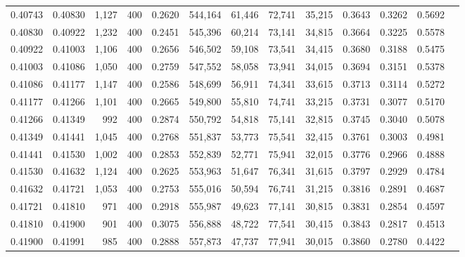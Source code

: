 \begin{tabular}{rrrrrrrrrrrrr}
0.40743 & 0.40830 &  1,127 & 400 &                                     0.2620 & 544,164 &  61,446 &  72,741 &  35,215 & 0.3643 & 0.3262 & 0.5692 \\
0.40830 & 0.40922 &  1,232 & 400 &                                     0.2451 & 545,396 &  60,214 &  73,141 &  34,815 & 0.3664 & 0.3225 & 0.5578 \\
0.40922 & 0.41003 &  1,106 & 400 &                                     0.2656 & 546,502 &  59,108 &  73,541 &  34,415 & 0.3680 & 0.3188 & 0.5475 \\
0.41003 & 0.41086 &  1,050 & 400 &                                     0.2759 & 547,552 &  58,058 &  73,941 &  34,015 & 0.3694 & 0.3151 & 0.5378 \\
0.41086 & 0.41177 &  1,147 & 400 &                                     0.2586 & 548,699 &  56,911 &  74,341 &  33,615 & 0.3713 & 0.3114 & 0.5272 \\
0.41177 & 0.41266 &  1,101 & 400 &                                     0.2665 & 549,800 &  55,810 &  74,741 &  33,215 & 0.3731 & 0.3077 & 0.5170 \\
0.41266 & 0.41349 &    992 & 400 &                                     0.2874 & 550,792 &  54,818 &  75,141 &  32,815 & 0.3745 & 0.3040 & 0.5078 \\
0.41349 & 0.41441 &  1,045 & 400 &                                     0.2768 & 551,837 &  53,773 &  75,541 &  32,415 & 0.3761 & 0.3003 & 0.4981 \\
0.41441 & 0.41530 &  1,002 & 400 &                                     0.2853 & 552,839 &  52,771 &  75,941 &  32,015 & 0.3776 & 0.2966 & 0.4888 \\
0.41530 & 0.41632 &  1,124 & 400 &                                     0.2625 & 553,963 &  51,647 &  76,341 &  31,615 & 0.3797 & 0.2929 & 0.4784 \\
0.41632 & 0.41721 &  1,053 & 400 &                                     0.2753 & 555,016 &  50,594 &  76,741 &  31,215 & 0.3816 & 0.2891 & 0.4687 \\
0.41721 & 0.41810 &    971 & 400 &                                     0.2918 & 555,987 &  49,623 &  77,141 &  30,815 & 0.3831 & 0.2854 & 0.4597 \\
0.41810 & 0.41900 &    901 & 400 &                                     0.3075 & 556,888 &  48,722 &  77,541 &  30,415 & 0.3843 & 0.2817 & 0.4513 \\
0.41900 & 0.41991 &    985 & 400 &                                     0.2888 & 557,873 &  47,737 &  77,941 &  30,015 & 0.3860 & 0.2780 & 0.4422 \\

\end{tabular}
